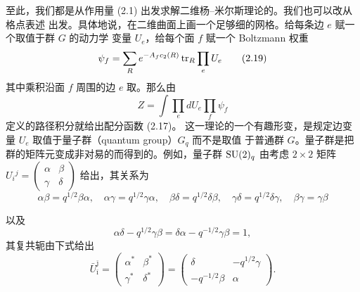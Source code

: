 至此，我们都是从作用量 (2.1) 出发求解二维杨--米尔斯理论的。我们也可以改从格点表述
出发。具体地说，在二维曲面上画一个足够细的网格。给每条边 $e$ 赋一个取值于群 $G$ 的动力学
变量 $U_e$，给每个面 $f$ 赋一个 Boltzmann 权重
\begin{equation}
  \psi_f=\sum_R e^{-A_fc_2(R)}\operatorname{tr}_R\prod_e U_e
  \tag{2.19}
\end{equation}
其中乘积沿面 $f$ 周围的边 $e$ 取。那么由
\begin{equation}
  Z=\int\prod_e dU_e\prod_f\psi_f
  \tag{2.20}
\end{equation}
定义的路径积分就给出配分函数 (2.17)。
这一理论的一个有趣形变，是规定边变量 $U_e$ 取值于量子群（quantum group）$G_q$ 而不是取值
于普通群 $G$。量子群是把群的矩阵元变成非对易的而得到的。例如，量子群 $\mathrm{SU}(2)_q$ 由考虑
$2\times2$ 矩阵 $U_i{}^j=\begin{pmatrix}\alpha&\beta\\\gamma&\delta\end{pmatrix}$ 给出，其关系为
\begin{equation}
  \alpha\beta=q^{1/2}\beta\alpha,\quad
  \alpha\gamma=q^{1/2}\gamma\alpha,\quad
  \beta\delta=q^{1/2}\delta\beta,\quad
  \gamma\delta=q^{1/2}\delta\gamma,\quad
  \beta\gamma=\gamma\beta
  \tag{2.21}
\end{equation}

以及
\begin{equation}
  \alpha\delta-q^{1/2}\gamma\beta=\delta\alpha-q^{-1/2}\gamma\beta=1,
  \tag{2.22}
\end{equation}
其复共轭由下式给出
\begin{equation}
  \bar{U}_{\bar{\imath}}^{\bar{\jmath}}
  =\begin{pmatrix}\alpha^*&\beta^*\\\gamma^*&\delta^*\end{pmatrix}
  =\begin{pmatrix}\delta&-q^{1/2}\gamma\\-q^{-1/2}\beta&\alpha\end{pmatrix}.
  \tag{2.23}
\end{equation}

